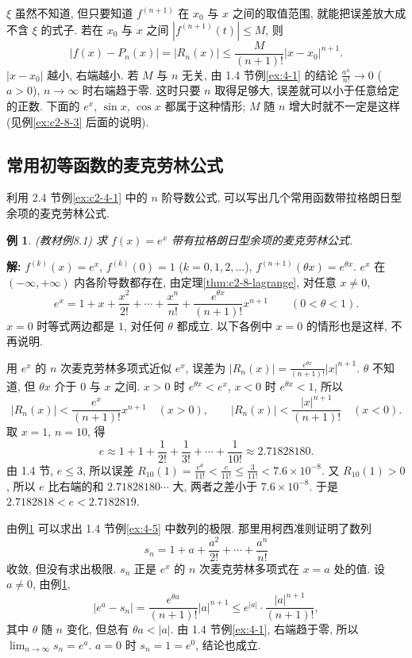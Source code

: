 \documentclass[UTF8,openany]{ctexbook}
\theoremstyle{chinesetextbook}
\newtheorem{example}{例}[section]
\newenvironment{cnsolution}{\par\indent\textbf{解:} \ignorespaces}{\par}
\begin{document}
$\xi$ 虽然不知道, 但只要知道 $f^{(n+1)}$ 在 $x_0$ 与 $x$ 之间的取值范围, 就能把误差放大成不含 $\xi$ 的式子. 若在 $x_0$ 与 $x$ 之间 $|f^{(n+1)}(t)|\le M$, 则
\[
|f(x)-P_n(x)|=|R_n(x)|\le\frac M{(n+1)!}|x-x_0|^{n+1}.
\]
$|x-x_0|$ 越小, 右端越小. 若 $M$ 与 $n$ 无关, 由 1.4 节例\ref{ex:4-1} 的结论 $\displaystyle\frac{a^n}{n!}\to0$ ($a>0$), $n\to\infty$ 时右端趋于零. 这时只要 $n$ 取得足够大, 误差就可以小于任意给定的正数. 下面的 $e^x$, $\sin x$, $\cos x$ 都属于这种情形; $M$ 随 $n$ 增大时就不一定是这样 (见例\ref{ex:c2-8-3} 后面的说明).
\subsection{常用初等函数的麦克劳林公式}
利用 2.4 节例\ref{ex:c2-4-1} 中的 $n$ 阶导数公式, 可以写出几个常用函数带拉格朗日型余项的麦克劳林公式.
\begin{example}\label{ex:c2-8-1}
\textnormal{(教材例8.1)} 求 $f(x)=e^x$ 带有拉格朗日型余项的麦克劳林公式.
\end{example}
\begin{cnsolution}
$f^{(k)}(x)=e^x$, $f^{(k)}(0)=1$ ($k=0,1,2,\ldots$), $f^{(n+1)}(\theta x)=e^{\theta x}$. $e^x$ 在 $(-\infty,+\infty)$ 内各阶导数都存在, 由定理\ref{thm:c2-8-lagrange}, 对任意 $x\ne0$,
\[
e^x=1+x+\frac{x^2}{2!}+\cdots+\frac{x^n}{n!}+\frac{e^{\theta x}}{(n+1)!}x^{n+1}\qquad(0<\theta<1).
\]
$x=0$ 时等式两边都是 $1$, 对任何 $\theta$ 都成立. 以下各例中 $x=0$ 的情形也是这样, 不再说明.
\end{cnsolution}
用 $e^x$ 的 $n$ 次麦克劳林多项式近似 $e^x$, 误差为 $\displaystyle|R_n(x)|=\frac{e^{\theta x}}{(n+1)!}|x|^{n+1}$. $\theta$ 不知道, 但 $\theta x$ 介于 $0$ 与 $x$ 之间. $x>0$ 时 $e^{\theta x}<e^x$, $x<0$ 时 $e^{\theta x}<1$, 所以
\[
|R_n(x)|<\frac{e^x}{(n+1)!}x^{n+1}\quad(x>0),\qquad|R_n(x)|<\frac{|x|^{n+1}}{(n+1)!}\quad(x<0).
\]
取 $x=1$, $n=10$, 得
\[
e\approx1+1+\frac1{2!}+\frac1{3!}+\cdots+\frac1{10!}\approx2.71828180.
\]
由 1.4 节, $e\le3$, 所以误差 $\displaystyle R_{10}(1)=\frac{e^\theta}{11!}<\frac e{11!}\le\frac3{11!}<7.6\times10^{-8}$. 又 $R_{10}(1)>0$, 所以 $e$ 比右端的和 $2.71828180\cdots$ 大, 两者之差小于 $7.6\times10^{-8}$. 于是 $2.7182818<e<2.7182819$.

由例\ref{ex:c2-8-1} 可以求出 1.4 节例\ref{ex:4-5} 中数列的极限. 那里用柯西准则证明了数列
\[
s_n=1+a+\frac{a^2}{2!}+\cdots+\frac{a^n}{n!}
\]
收敛, 但没有求出极限. $s_n$ 正是 $e^x$ 的 $n$ 次麦克劳林多项式在 $x=a$ 处的值. 设 $a\ne0$, 由例\ref{ex:c2-8-1},
\[
|e^a-s_n|=\frac{e^{\theta a}}{(n+1)!}|a|^{n+1}\le e^{|a|}\cdot\frac{|a|^{n+1}}{(n+1)!},
\]
其中 $\theta$ 随 $n$ 变化, 但总有 $\theta a<|a|$. 由 1.4 节例\ref{ex:4-1}, 右端趋于零, 所以 $\displaystyle\lim_{n\to\infty}s_n=e^a$. $a=0$ 时 $s_n=1=e^0$, 结论也成立.
\end{document}
